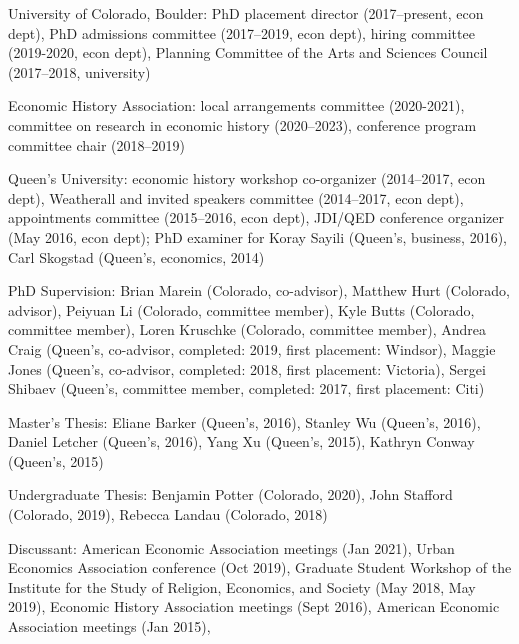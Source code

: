 \documentclass[11pt,letterpaper]{article}
\begin{document}
\begin{description}[leftmargin=0in,itemsep=.25em,itemindent=0in]

\item University of Colorado, Boulder: PhD placement director (2017--present, econ dept), PhD admissions committee (2017--2019, econ dept), hiring committee (2019-2020, econ dept), Planning Committee of the Arts and Sciences Council (2017--2018, university) 

\item Economic History Association: local arrangements committee (2020-2021), committee on research in economic history (2020--2023), conference program committee chair (2018--2019)

\item Queen's University: economic history workshop co-organizer (2014--2017, econ dept), Weatherall and invited speakers committee (2014--2017, econ dept), appointments committee (2015--2016, econ dept), JDI/QED conference organizer (May 2016, econ dept); PhD examiner for Koray Sayili (Queen's, business, 2016), Carl Skogstad (Queen's, economics, 2014)


\item PhD Supervision: Brian Marein (Colorado, co-advisor), Matthew Hurt (Colorado, advisor), Peiyuan Li (Colorado, committee member), Kyle Butts (Colorado, committee member), Loren Kruschke (Colorado, committee member),  Andrea Craig (Queen's, co-advisor, completed: 2019, first placement: Windsor), Maggie Jones (Queen's, co-advisor, completed: 2018, first placement:  Victoria), Sergei Shibaev (Queen's, committee member, completed: 2017, first placement: Citi)

\item Master's Thesis: Eliane Barker (Queen's, 2016),  Stanley Wu (Queen's, 2016), Daniel Letcher (Queen's, 2016), Yang Xu (Queen's, 2015), Kathryn Conway (Queen's, 2015)

\item Undergraduate Thesis: Benjamin Potter (Colorado, 2020), John Stafford (Colorado, 2019), Rebecca Landau (Colorado, 2018) %

\item Discussant: American Economic Association meetings (Jan 2021), Urban Economics Association conference (Oct 2019), Graduate Student Workshop of the Institute for the Study of Religion, Economics, and Society (May 2018, May 2019), Economic History Association meetings (Sept 2016), American Economic Association meetings (Jan 2015),


\end{description}
\end{document}
